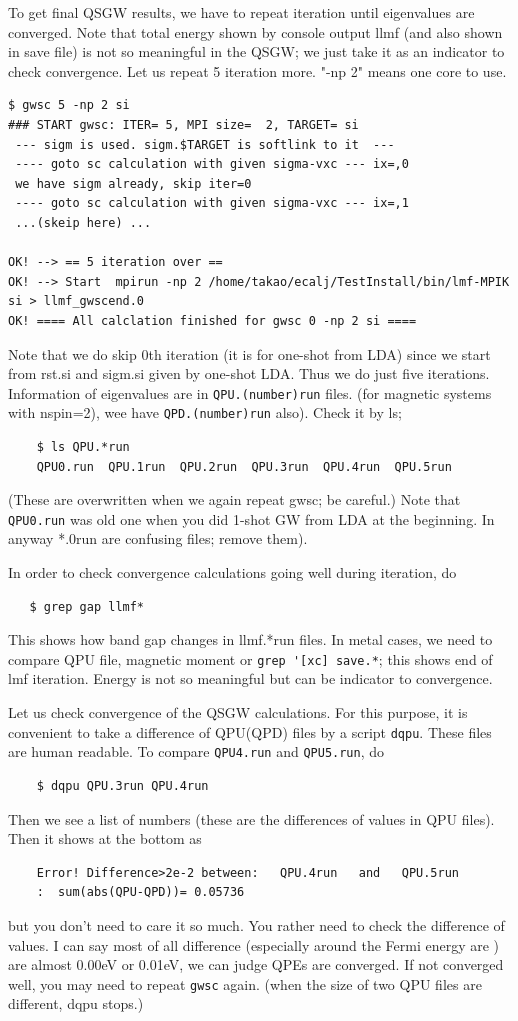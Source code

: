 To get final QSGW results, we have to repeat iteration 
until eigenvalues are converged.
Note that total energy shown by console output llmf (and also shown in
save file) is not so meaningful in the QSGW; we just take it as an indicator to check convergence. 
Let us repeat 5 iteration more. "-np 2" means one core to use.
\begin{verbatim}
$ gwsc 5 -np 2 si
### START gwsc: ITER= 5, MPI size=  2, TARGET= si
 --- sigm is used. sigm.$TARGET is softlink to it  ---
 ---- goto sc calculation with given sigma-vxc --- ix=,0
 we have sigm already, skip iter=0
 ---- goto sc calculation with given sigma-vxc --- ix=,1
 ...(skeip here) ...

OK! --> == 5 iteration over ==
OK! --> Start  mpirun -np 2 /home/takao/ecalj/TestInstall/bin/lmf-MPIK  si > llmf_gwscend.0 
OK! ==== All calclation finished for gwsc 0 -np 2 si ====
\end{verbatim}
Note that we do skip 0th iteration (it is for one-shot from LDA) since
we start from rst.si and sigm.si given by one-shot LDA.
Thus we do just five iterations.
Information of eigenvalues are in \verb+QPU.(number)run+ files.
(for magnetic systems with nspin=2), wee have \verb+QPD.(number)run+ also).
Check it by ls;
\begin{verbatim}
    $ ls QPU.*run
    QPU0.run  QPU.1run  QPU.2run  QPU.3run  QPU.4run  QPU.5run
\end{verbatim}
(These are overwritten when we again repeat gwsc; be careful.)
Note that \verb+QPU0.run+ was old one when you did 1-shot GW from LDA 
at the beginning. In anyway *.0run are confusing files; remove them).

In order to check convergence calculations going well during iteration, do
\begin{verbatim}
   $ grep gap llmf*
\end{verbatim}
This shows how band gap changes in llmf.*run files.
In metal cases, we need to compare QPU file, magnetic moment or
\verb+grep '[xc] save.*+; this shows end of lmf iteration.
Energy is not so meaningful but can be indicator to convergence.

Let us check convergence of the QSGW calculations.
For this purpose, it is convenient to take a difference of QPU(QPD) files
by a script \verb+dqpu+. These files are human readable.
To compare \verb+QPU4.run+ and \verb+QPU5.run+, do
\begin{verbatim}
    $ dqpu QPU.3run QPU.4run
\end{verbatim}
Then we see a list of numbers (these are the differences of values in
QPU files).  Then it shows at the bottom as
\begin{verbatim}
    Error! Difference>2e-2 between:   QPU.4run   and   QPU.5run  
    :  sum(abs(QPU-QPD))= 0.05736
\end{verbatim}
but you don't need to care it so much.
You rather need to check the difference of values.
I can say most of all difference (especially around the Fermi energy are
) are almost 0.00eV or 0.01eV, we can judge QPEs are converged.
If not converged well, you may need to repeat 
\verb+gwsc+ again.
(when the size of two QPU files are different, dqpu stops.)

